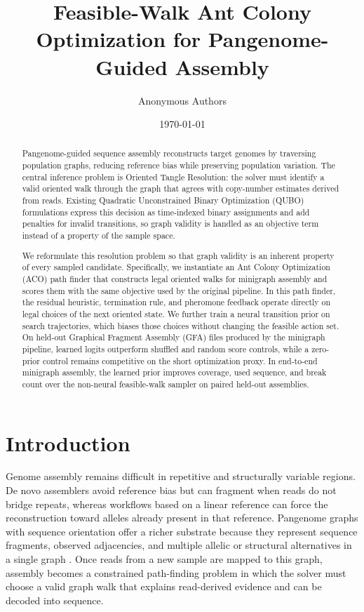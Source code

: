 \documentclass[11pt]{article}
\title{Feasible-Walk Ant Colony Optimization for Pangenome-Guided Assembly}
\author{Anonymous Authors}
\date{\today}
\begin{document}
\maketitle

\begin{abstract}
Pangenome-guided sequence assembly reconstructs target genomes by traversing population graphs, reducing reference bias while preserving population variation. The central inference problem is Oriented Tangle Resolution: the solver must identify a valid oriented walk through the graph that agrees with copy-number estimates derived from reads. Existing Quadratic Unconstrained Binary Optimization (QUBO) formulations express this decision as time-indexed binary assignments and add penalties for invalid transitions, so graph validity is handled as an objective term instead of a property of the sample space.

We reformulate this resolution problem so that graph validity is an inherent property of every sampled candidate. Specifically, we instantiate an Ant Colony Optimization (ACO) path finder that constructs legal oriented walks for minigraph assembly and scores them with the same objective used by the original pipeline. In this path finder, the residual heuristic, termination rule, and pheromone feedback operate directly on legal choices of the next oriented state. We further train a neural transition prior on search trajectories, which biases those choices without changing the feasible action set. On held-out Graphical Fragment Assembly (GFA) files produced by the minigraph pipeline, learned logits outperform shuffled and random score controls, while a zero-prior control remains competitive on the short optimization proxy. In end-to-end minigraph assembly, the learned prior improves coverage, used sequence, and break count over the non-neural feasible-walk sampler on paired held-out assemblies.
\end{abstract}

\section{Introduction}

Genome assembly remains difficult in repetitive and structurally variable regions. De novo assemblers avoid reference bias but can fragment when reads do not bridge repeats, whereas workflows based on a linear reference can force the reconstruction toward alleles already present in that reference. Pangenome graphs with sequence orientation offer a richer substrate because they represent sequence fragments, observed adjacencies, and multiple allelic or structural alternatives in a single graph \citep{ballouz2019reference,schneider2017grch38,matthews2024gentle,liao2023draft,hickey2020vg,li2020minigraph}. Once reads from a new sample are mapped to this graph, assembly becomes a constrained path-finding problem in which the solver must choose a valid graph walk that explains read-derived evidence and can be decoded into sequence.
\end{document}
